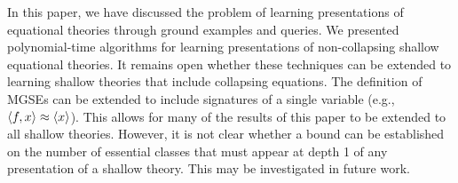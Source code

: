 
In this paper, we have discussed the problem of learning presentations of equational theories through ground examples and queries. 
We presented polynomial-time algorithms for learning presentations of non-collapsing shallow equational theories. 
It remains open whether these techniques can be extended to learning shallow theories that include collapsing equations.
The definition of MGSEs can be extended to include signatures of a single variable (e.g., $\langle f,x \rangle \approx \langle x \rangle$).
This allows for many of the results of this paper to be extended to all shallow theories.
However, it is not clear whether a bound can be established on the number of essential classes that must appear at depth 1 of any presentation of a shallow theory.
This may be investigated in future work.
